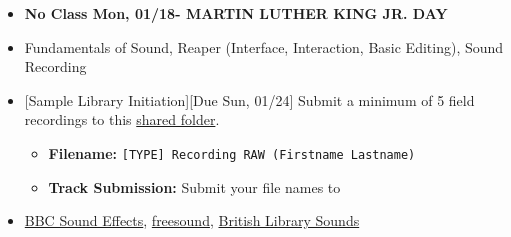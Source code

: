 \def\dMon{Mon, 01/18}
\def\dTues{Tues, 01/19}
\def\dWed{Wed, 01/20}
\def\dThur{Thur, 01/21}
\def\dFri{Fri, 01/22}
\def\dSat{Sat, 01/23}
\def\dSun{Sun, 01/24}
\placeDate

\begin{itemize}[noitemsep,topsep=0pt,leftmargin=*]
	\item \textcolor{defaultColor}{\textbf{No Class \dMon - MARTIN LUTHER KING JR. DAY}}

	\item {} Fundamentals of Sound, Reaper (Interface, Interaction, Basic Editing), Sound Recording
	\item {}[Sample Library Initiation][Due \dSun] \newline
	      Submit a minimum of 5 field recordings to this \href{\samplelibInitURL}{shared folder}.
	      \begin{itemize}
		      \item \textbf{Filename:} \texttt{[TYPE] Recording RAW (Firstname Lastname)}
		      \item \textbf{Track Submission:} Submit your file names to \discordE
	      \end{itemize}
	\item {} \href{https://sound-effects.bbcrewind.co.uk/}{BBC Sound Effects}, \href{https://freesound.org/}{freesound}, \href{https://sounds.bl.uk/}{British Library Sounds}
\end{itemize}